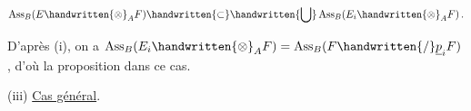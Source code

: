 \[
\operatorname{Ass}_B(E\handwritten{\otimes}_A F)\handwritten{\subset}\handwritten{\bigcup}\operatorname{Ass}_B(E_i\handwritten{\otimes}_A F)\,.
\]

D'après (i), on a $\operatorname{Ass}_B(E_i\handwritten{\otimes}_A F)=\operatorname{Ass}_B(F\handwritten{/}\underline p_i F)$, d'où la proposition dans ce cas.

(iii) \uline{Cas général}.

